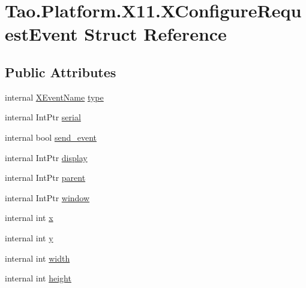 \hypertarget{struct_tao_1_1_platform_1_1_x11_1_1_x_configure_request_event}{
\section{Tao.Platform.X11.XConfigureRequestEvent Struct Reference}
\label{struct_tao_1_1_platform_1_1_x11_1_1_x_configure_request_event}
}
\subsection*{Public Attributes}
\begin{DoxyCompactItemize}
\item 
internal \hyperlink{namespace_tao_1_1_platform_1_1_x11_aff81ed5b8778e1ea8e872861dff9f146}{XEventName} \hyperlink{struct_tao_1_1_platform_1_1_x11_1_1_x_configure_request_event_a4f46a26bf1853d568ea113e23dc56b24}{type}
\item 
internal IntPtr \hyperlink{struct_tao_1_1_platform_1_1_x11_1_1_x_configure_request_event_a7b5cdb8930b6b8e4295042b6489c581f}{serial}
\item 
internal bool \hyperlink{struct_tao_1_1_platform_1_1_x11_1_1_x_configure_request_event_a85c9d13d94371e1e72b75f4741798227}{send\_\-event}
\item 
internal IntPtr \hyperlink{struct_tao_1_1_platform_1_1_x11_1_1_x_configure_request_event_ad813c1c06dcf9acd92362ca222e5a12b}{display}
\item 
internal IntPtr \hyperlink{struct_tao_1_1_platform_1_1_x11_1_1_x_configure_request_event_a7ad04e3dc33579bdb03aa50574992e8b}{parent}
\item 
internal IntPtr \hyperlink{struct_tao_1_1_platform_1_1_x11_1_1_x_configure_request_event_a30719e0cb2a03ece21210ff5d263519c}{window}
\item 
internal int \hyperlink{struct_tao_1_1_platform_1_1_x11_1_1_x_configure_request_event_af52dfb96eacd083f3e6ba5d84ad12aab}{x}
\item 
internal int \hyperlink{struct_tao_1_1_platform_1_1_x11_1_1_x_configure_request_event_af6989ddbbcb106b0c6d892a30584d68a}{y}
\item 
internal int \hyperlink{struct_tao_1_1_platform_1_1_x11_1_1_x_configure_request_event_aeac9e69e4425eb3e0c115ab5c1ad321d}{width}
\item 
internal int \hyperlink{struct_tao_1_1_platform_1_1_x11_1_1_x_configure_request_event_ac27c335142d7e9b23dd21cd064107893}{height}
\item 

\end{DoxyCompactItemize}

